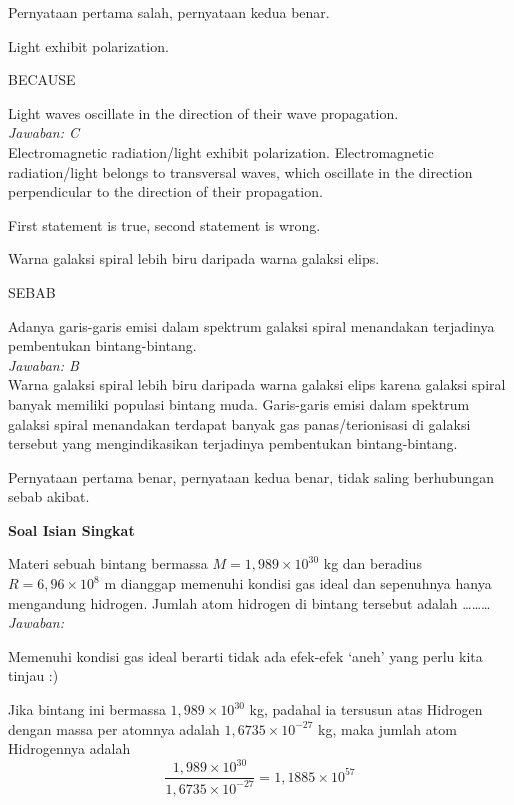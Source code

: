 \documentclass[11pt,fleqn]{exam}
\begin{document}
\begin{questions}
Pernyataan pertama salah, pernyataan kedua benar.

\vspace{0.3cm}
\question Light exhibit polarization.
\begin{center}
BECAUSE
\end{center}
Light waves oscillate in the direction of their wave propagation.\\

\textit{Jawaban: C}\\
Electromagnetic radiation/light exhibit polarization. Electromagnetic radiation/light belongs to transversal waves, which oscillate in the direction perpendicular to the direction of their propagation.

First statement is true, second statement is wrong.

\vspace{0.3cm}
\question Warna galaksi spiral lebih biru daripada warna galaksi elips.
\begin{center}
SEBAB
\end{center}
Adanya garis-garis emisi dalam spektrum galaksi spiral menandakan terjadinya pembentukan bintang-bintang.\\

\textit{Jawaban: B} \\
Warna galaksi spiral lebih biru daripada warna galaksi elips karena galaksi spiral banyak memiliki populasi bintang muda. Garis-garis emisi dalam spektrum galaksi spiral menandakan terdapat banyak gas panas/terionisasi di galaksi tersebut yang mengindikasikan terjadinya pembentukan bintang-bintang.

Pernyataan pertama benar, pernyataan kedua benar, tidak saling berhubungan sebab akibat.

\vspace{0.5cm}
\textbf{Soal Isian Singkat}

\question Materi sebuah bintang bermassa $M=1,989\times 10^{30}$ kg dan beradius $R=6,96\times 10^8$ m dianggap memenuhi kondisi gas ideal dan sepenuhnya hanya mengandung hidrogen. Jumlah atom hidrogen di bintang tersebut adalah \ldots\ldots\ldots \\

\textit{Jawaban: }

Memenuhi kondisi gas ideal berarti tidak ada efek-efek `aneh' yang perlu kita tinjau :)

Jika bintang ini bermassa $1,989 \times 10^{30}$ kg, padahal ia tersusun atas Hidrogen dengan massa per atomnya adalah $1,6735 \times 10^{-27}$ kg, maka jumlah atom Hidrogennya adalah 
$$\frac{1,989 \times 10^{30}}{1,6735 \times 10^{-27}} = 1,1885 \times 10^{57}$$



\end{questions}
\end{document}
